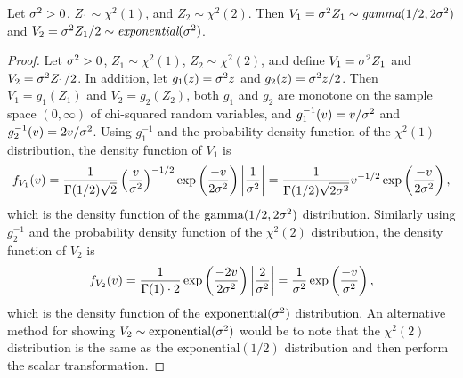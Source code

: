 \begin{lemma}
\label{lem:Thm connection}
Let $\sigma^2 > 0$, $Z_1 \sim \chi^2(1)$, and $Z_2 \sim \chi^2(2)$. Then $V_1 = \sigma^2 Z_1 \sim \emph{gamma}(1/2,2\sigma^2)$ and $V_2 = \sigma^2 Z_1/2 \sim \emph{exponential}(\sigma^2)$. 
\end{lemma}
\begin{proof}
Let $\sigma^2 > 0$, $Z_1 \sim \chi^2(1)$, $Z_2 \sim \chi^2(2)$, and define $V_1 = \sigma^2 Z_1$ and $V_2 = \sigma^2 Z_1/2$. In addition, let $g_1(z) = \sigma^2 z$ and $g_2(z) = \sigma^2 z/2$. Then $V_1 = g_1(Z_1)$ and $V_2 = g_2(Z_2)$, both $g_1$ and $g_2$ are monotone on the sample space $(0,\infty)$ of chi-squared random variables, and $g_1^{-1}(v) = v/\sigma^2$ and $g_2^{-1}(v) = 2v/\sigma^2$. Using $g_1^{-1}$ and the probability density function of the $\chi^2(1)$ distribution, the density function of $V_1$ is
\[f_{V_1}(v) = \frac{1}{\Gamma(1/2)\sqrt{2}}\left(\frac{v}{\sigma^2}\right)^{-1/2}\exp\left(\frac{-v}{2\sigma^2}\right)\left|\frac{1}{\sigma^2}\right| = \frac{1}{\Gamma(1/2)\sqrt{2\sigma^2}}v^{-1/2}\exp\left(\frac{-v}{2\sigma^2}\right),\]
which is the density function of the $\text{gamma}(1/2,2\sigma^2)$ distribution. Similarly using $g_2^{-1}$ and the probability density function of the $\chi^2(2)$ distribution, the density function of $V_2$ is
\[f_{V_2}(v) = \frac{1}{\Gamma(1)\cdot 2}\exp\left(\frac{-2v}{2\sigma^2}\right)\left|\frac{2}{\sigma^2}\right| = \frac{1}{\sigma^2}\exp\left(\frac{-v}{\sigma^2}\right),\]
which is the density function of the $\text{exponential}(\sigma^2)$ distribution. An alternative method for showing $V_2 \sim \text{exponential}(\sigma^2)$ would be to note that the $\chi^2(2)$ distribution is the same as the $\text{exponential}(1/2)$ distribution and then perform the scalar transformation.
\end{proof}

